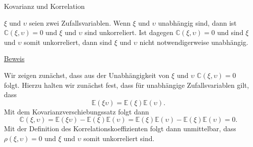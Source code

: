 \documentclass[
  8pt,
  ignorenonframetext,
]{beamer}
\newcommand{\ups}{\upsilon}
\begin{document}
\begin{frame}{Kovarianz und Korrelation}
\protect\hypertarget{kovarianz-und-korrelation-6}{}
\small
\begin{theorem}
\justifying
\normalfont
$\xi$ und $\ups$ seien zwei Zufallsvariablen. Wenn $\xi$ und $\ups$ unabhängig sind, 
dann ist $\mathbb{C}(\xi,\ups) = 0$ und $\xi$ und $\ups$ sind unkorreliert. Ist dagegen
$\mathbb{C}(\xi,\ups) = 0$ und sind $\xi$ und $\ups$ somit unkorreliert, dann sind $\xi$ 
und $\ups$ nicht notwendigerweise unabhängig.
\end{theorem}

\footnotesize

\underline{Beweis} \vspace{1mm}

Wir zeigen zunächst, dass aus der Unabhängigkeit von \(\xi\) und
\(\ups\) \(\mathbb{C}(\xi,\ups) = 0\) folgt. Hierzu halten wir zunächst
fest, dass für unabhängige Zufallsvariablen gilt, dass \begin{equation}
\mathbb{E}(\xi\ups) = \mathbb{E}(\xi)\mathbb{E}(\ups).
\end{equation} Mit dem Kovarianzverschiebungssatz folgt dann
\begin{equation}
\mathbb{C}(\xi,\ups)
= \mathbb{E}(\xi\ups) - \mathbb{E}(\xi)\mathbb{E}(\ups)
= \mathbb{E}(\xi)\mathbb{E}(\ups) - \mathbb{E}(\xi)\mathbb{E}(\ups)
= 0.
\end{equation} Mit der Definition des Korrelationskoeffizienten folgt
dann unmittelbar, dass \(\rho(\xi,\ups) = 0\) und \(\xi\) und \(\ups\)
somit unkorreliert sind.
\end{frame}
\end{document}
